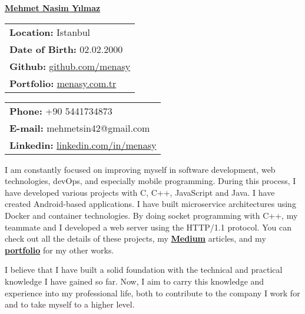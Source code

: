 \documentclass[a4paper,11pt]{article}
\begin{document}
\vspace*{-6.5em} 
\begin{center}
    \href{https://menasy.com.tr/}{\LARGE \textbf{Mehmet Nasim Yılmaz}}
\end{center}
\vspace*{0.4em} 
\noindent
\begin{minipage}[t]{0.48\textwidth}
    \begin{tabular}{@{}l}
        \textbf{Location:} Istanbul \\
        \textbf{Date of Birth:} 02.02.2000 \\
        \textbf{Github:} \href{https://github.com/menasy}{github.com/menasy} \\
        \textbf{Portfolio:} \href{https://menasy.com.tr/}{menasy.com.tr} \\
    \end{tabular}
\end{minipage}%
\hfill
\begin{minipage}[t]{0.48\textwidth}
    \raggedleft
    \begin{tabular}{@{}l}
        \textbf{Phone:} +90 5441734873 \\
        \textbf{E-mail:} mehmetsin42@gmail.com \\
        \textbf{Linkedin:} \href{https://linkedin.com/in/menasy}{linkedin.com/in/menasy} \\
    \end{tabular}
\end{minipage}

\vspace{0.7em}

I am constantly focused on improving myself in software development, web technologies, devOps, and especially mobile programming. During this process, I have developed various projects with C, C++, JavaScript and Java. I have created Android-based applications. I have built microservice architectures using Docker and container technologies. By doing socket programming with C++, my teammate and I developed a web server using the HTTP/1.1 protocol. You can check out all the details of these projects, my \textbf{\href{https://medium.com/@menasy}{Medium}} articles, and my \textbf{\href{https://menasy.com.tr/}{portfolio}} for my other works.
\vspace{-0.6em}

I believe that I have built a solid foundation with the technical and practical knowledge I have gained so far. Now, I aim to carry this knowledge and experience into my professional life, both to contribute to the company I work for and to take myself to a higher level.
\vspace{-0.6em}
\end{document}
